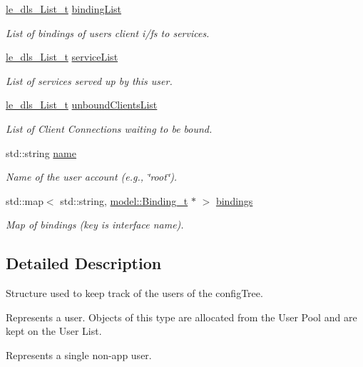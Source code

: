 \begin{DoxyCompactItemize}
\hyperlink{structle__dls___list__t}{le\+\_\+dls\+\_\+\+List\+\_\+t} \hyperlink{struct_user__t_abec5fdbbeff4e26b427c9afc21bc7c91}{binding\+List}
\begin{DoxyCompactList}\small\item\em List of bindings of user\textquotesingle{}s client i/fs to services. \end{DoxyCompactList}\item 
\hyperlink{structle__dls___list__t}{le\+\_\+dls\+\_\+\+List\+\_\+t} \hyperlink{struct_user__t_a720e8b4b0f337ce5e546f581a46e29e4}{service\+List}
\begin{DoxyCompactList}\small\item\em List of services served up by this user. \end{DoxyCompactList}\item 
\hyperlink{structle__dls___list__t}{le\+\_\+dls\+\_\+\+List\+\_\+t} \hyperlink{struct_user__t_a941a342563c51929f5346e251096ee49}{unbound\+Clients\+List}
\begin{DoxyCompactList}\small\item\em List of Client Connections waiting to be bound. \end{DoxyCompactList}\item 
std\+::string \hyperlink{struct_user__t_ae47d1ff0d855f07b3d28953e291ada70}{name}
\begin{DoxyCompactList}\small\item\em Name of the user account (e.\+g., \char`\"{}root\char`\"{}). \end{DoxyCompactList}\item 
std\+::map$<$ std\+::string, \hyperlink{structmodel_1_1_binding__t}{model\+::\+Binding\+\_\+t} $\ast$ $>$ \hyperlink{struct_user__t_ac0cffa50b74aef93a2b3be427ab2a0d2}{bindings}
\begin{DoxyCompactList}\small\item\em Map of bindings (key is interface name). \end{DoxyCompactList}\end{DoxyCompactItemize}


\subsection{Detailed Description}
Structure used to keep track of the users of the config\+Tree.

Represents a user. Objects of this type are allocated from the User Pool and are kept on the User List.

Represents a single non-\/app user. 

